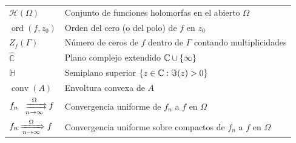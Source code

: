 \begin{tabular}{ll}
    $\mathcal{H}(\Omega)$ & Conjunto de funciones holomorfas en el abierto $\Omega$ \\
    $\operatorname{ord}(f,z_0)$ & Orden del cero (o del polo) de $f$ en $z_0$ \\
    $Z_f(\Gamma)$ & Número de ceros de $f$ dentro de $\Gamma$ contando multiplicidades \\
    $\widehat{\mathbb{C}}$ & Plano complejo extendido $\mathbb{C} \cup \{\infty\}$ \\
    $\mathbb{H}$ & Semiplano superior $\{z\in\mathbb{C} : \Im(z) > 0\}$ \\
    $\operatorname{conv}(A)$ & Envoltura convexa de $A$ \\
    $f_n \xrightrightarrows[n \to \infty]{\Omega} f$ & Convergencia uniforme de $f_n$ a $f$ en $\Omega$ \\
    $f_n \xRightarrow[n \to \infty]{\Omega} f$ & Convergencia uniforme sobre compactos de $f_n$ a $f$ en $\Omega$ \\
\end{tabular}